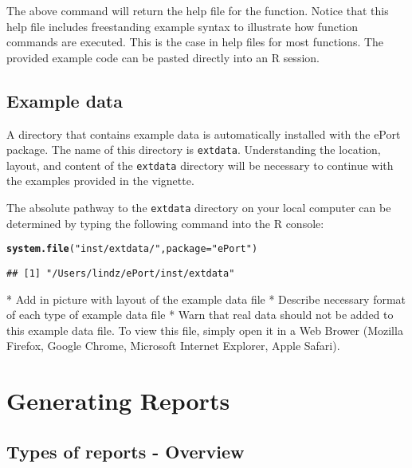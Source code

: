 \documentclass{article}\usepackage[]{graphicx}\usepackage[]{color}
\makeatletter
\newcommand{\hlstr}[1]{\textcolor[rgb]{0.192,0.494,0.8}{#1}}%
\newcommand{\hlstd}[1]{\textcolor[rgb]{0.345,0.345,0.345}{#1}}%
\newcommand{\hlkwc}[1]{\textcolor[rgb]{0.333,0.667,0.333}{#1}}%
\newcommand{\hlkwd}[1]{\textcolor[rgb]{0.737,0.353,0.396}{\textbf{#1}}}%
\newenvironment{kframe}{%
 \def\at@end@of@kframe{}%
 \ifinner\ifhmode%
  \def\at@end@of@kframe{\end{minipage}}%
  \begin{minipage}{\columnwidth}%
 \fi\fi%
 \def\FrameCommand##1{\hskip\@totalleftmargin \hskip-\fboxsep
 \colorbox{shadecolor}{##1}\hskip-\fboxsep
     \hskip-\linewidth \hskip-\@totalleftmargin \hskip\columnwidth}%
 \MakeFramed {\advance\hsize-\width
   \@totalleftmargin\z@ \linewidth\hsize
   \@setminipage}}%
 {\par\unskip\endMakeFramed%
 \at@end@of@kframe}
\newenvironment{knitrout}{}{} %
\numberwithin{equation}{section} %
\newcommand{\R}{{\normalfont\textsf{R }}{}}
\makeatother
\begin{document}
The above command will return the help file for the function. Notice that this help file includes freestanding example syntax to illustrate how function commands are executed. This is the case in help files for most functions. The provided example code can be pasted directly into an \R session.

\subsection{Example data}

A directory that contains example data is automatically installed with the ePort package. The name of this directory is \texttt{extdata}. Understanding the location, layout, and content of the \texttt{extdata} directory will be necessary to continue with the examples provided in the vignette.

The absolute pathway to the \texttt{extdata} directory on your local computer can be determined by typing the following command into the R console:

\begin{knitrout}
\color{fgcolor}\begin{kframe}
\begin{alltt}
\hlkwd{system.file}\hlstd{(}\hlstr{"inst/extdata/"}\hlstd{,} \hlkwc{package}\hlstd{=}\hlstr{"ePort"}\hlstd{)}
\end{alltt}
\begin{verbatim}
## [1] "/Users/lindz/ePort/inst/extdata"
\end{verbatim}
\end{kframe}
\end{knitrout}

* Add in picture with layout of the example data file  
* Describe necessary format of each type of example data file  
* Warn that real data should not be added to this example data file.
To view this file, simply open it in a Web Brower (Mozilla Firefox, Google Chrome, Microsoft Internet Explorer, Apple Safari).  

\section{Generating Reports}

\subsection{Types of reports - Overview}
\end{document}
